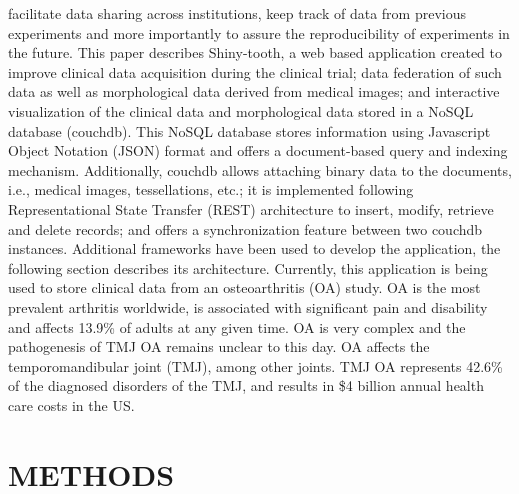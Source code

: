 \documentclass[]{spie}  %
\begin{document}
facilitate data sharing across institutions, keep track of data from previous experiments and more importantly to 
assure the reproducibility of experiments in the future.
This paper describes Shiny-tooth, a web based application created to improve clinical data acquisition during the clinical trial; 
data federation of such data as well as morphological data derived from medical images; and interactive visualization 
of the clinical data and morphological data stored in a NoSQL database (couchdb). This NoSQL database stores information using Javascript Object Notation 
(JSON) format and offers a document-based query and indexing mechanism. Additionally, couchdb allows attaching binary data to the documents, i.e., medical images, tessellations, etc.; it is implemented following Representational State Transfer (REST) architecture to insert, modify, retrieve and delete records; 
and offers a synchronization feature between two couchdb instances.
Additional frameworks have been used to develop the application, the following section describes its architecture. Currently, this application is being used to store clinical data from an osteoarthritis (OA) study. OA is the most prevalent arthritis worldwide, is associated with significant pain and disability and affects 13.9\% of adults at any given time. OA is very complex and the pathogenesis of TMJ OA remains unclear to this day. OA affects the temporomandibular joint (TMJ), among other joints. TMJ OA represents 42.6\% of the diagnosed disorders of the TMJ, and results in \$4 billion annual health care costs in the US\cite{Cevidanes2010110}\cite{Paniagua2011345}. 

\section{METHODS} 
\label{sec:METHODS}
\end{document}
